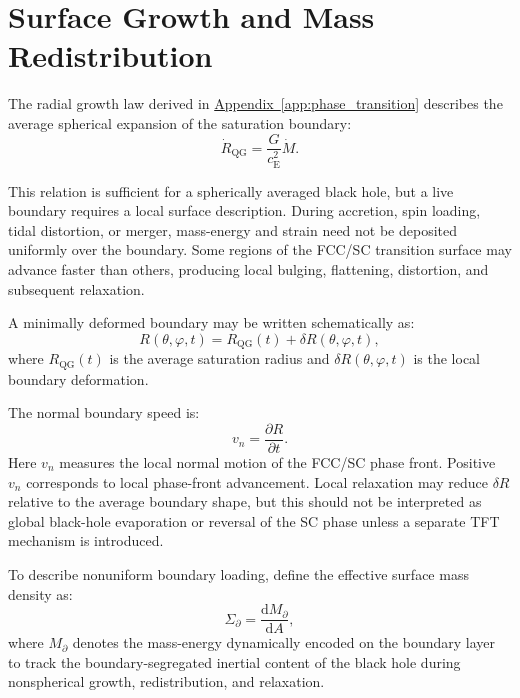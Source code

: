 \section{Surface Growth and Mass Redistribution}

The radial growth law derived in \hyperref[app:phase_transition]{Appendix~\ref*{app:phase_transition}} describes the average spherical expansion of the saturation boundary:
\begin{equation}
    \dot{R}_{\mathrm{QG}} = \frac{G}{c_{\mathrm{E}}^2}\dot{M}.
\end{equation}

This relation is sufficient for a spherically averaged black hole, but a live boundary requires a local surface description. During accretion, spin loading, tidal distortion, or merger, mass-energy and strain need not be deposited uniformly over the boundary. Some regions of the FCC/SC transition surface may advance faster than others, producing local bulging, flattening, distortion, and subsequent relaxation.

A minimally deformed boundary may be written schematically as:
\begin{equation}
    R(\theta,\varphi,t) = R_{\mathrm{QG}}(t) + \delta R(\theta,\varphi,t),
\end{equation}
where $R_{\mathrm{QG}}(t)$ is the average saturation radius and $\delta R(\theta,\varphi,t)$ is the local boundary deformation.

The normal boundary speed is:
\begin{equation}
    v_n = \frac{\partial R}{\partial t}.
\end{equation}
Here $v_n$ measures the local normal motion of the FCC/SC phase front. Positive $v_n$ corresponds to local phase-front advancement. Local relaxation may reduce $\delta R$ relative to the average boundary shape, but this should not be interpreted as global black-hole evaporation or reversal of the SC phase unless a separate TFT mechanism is introduced.

To describe nonuniform boundary loading, define the effective surface mass density as:
\begin{equation}
    \Sigma_{\partial} = \frac{\mathrm{d}M_{\partial}}{\mathrm{d}A},
\end{equation}
where $M_{\partial}$ denotes the mass-energy dynamically encoded on the boundary layer to track the boundary-segregated inertial content of the black hole during nonspherical growth, redistribution, and relaxation.

